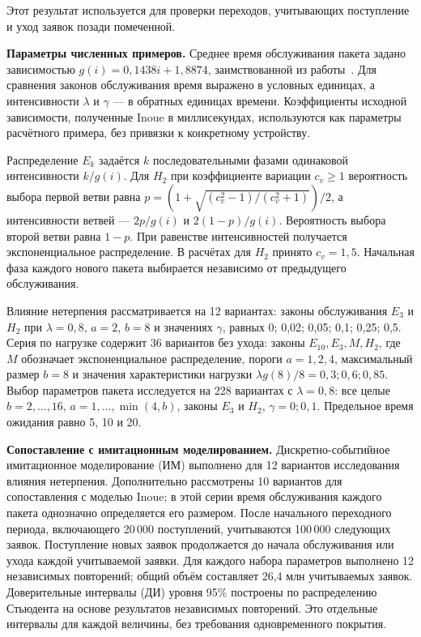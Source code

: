 Этот результат используется для проверки переходов, учитывающих поступление и уход заявок позади помеченной.

\noindent\textbf{Параметры численных примеров.}
Среднее время обслуживания пакета задано зависимостью $g(i)=0{,}1438i+1{,}8874$, заимствованной из работы~\cite{inoue2021}. Для сравнения законов обслуживания время выражено в условных единицах, а интенсивности $\lambda$ и $\gamma$ --- в обратных единицах времени. Коэффициенты исходной зависимости, полученные Inoue в миллисекундах, используются как параметры расчётного примера, без привязки к конкретному устройству.

Распределение $E_k$ задаётся $k$ последовательными фазами одинаковой интенсивности $k/g(i)$. Для $H_2$ при коэффициенте вариации $c_v\geq1$ вероятность выбора первой ветви равна $p=(1+\sqrt{(c_v^2-1)/(c_v^2+1)})/2$, а интенсивности ветвей --- $2p/g(i)$ и $2(1-p)/g(i)$. Вероятность выбора второй ветви равна $1-p$. При равенстве интенсивностей получается экспоненциальное распределение. В расчётах для $H_2$ принято $c_v=1{,}5$. Начальная фаза каждого нового пакета выбирается независимо от предыдущего обслуживания.

Влияние нетерпения рассматривается на 12 вариантах: законы обслуживания $E_3$ и $H_2$ при $\lambda=0{,}8$, $a=2$, $b=8$ и значениях $\gamma$, равных 0; 0,02; 0,05; 0,1; 0,25; 0,5. Серия по нагрузке содержит 36 вариантов без ухода: законы $E_{10},E_3,M,H_2$, где $M$ обозначает экспоненциальное распределение, пороги $a=1,2,4$, максимальный размер $b=8$ и значения характеристики нагрузки $\lambda g(8)/8=0{,}3;0{,}6;0{,}85$. Выбор параметров пакета исследуется на 228 вариантах с $\lambda=0{,}8$: все целые $b=2,\ldots,16$, $a=1,\ldots,\min(4,b)$, законы $E_3$ и $H_2$, $\gamma=0;0{,}1$. Предельное время ожидания равно 5, 10 и 20.

\noindent\textbf{Сопоставление с имитационным моделированием.}
Дискретно-событийное имитационное моделирование (ИМ) выполнено для 12 вариантов исследования влияния нетерпения. Дополнительно рассмотрены 10 вариантов для сопоставления с моделью Inoue; в этой серии время обслуживания каждого пакета однозначно определяется его размером. После начального переходного периода, включающего 20\,000 поступлений, учитываются 100\,000 следующих заявок. Поступление новых заявок продолжается до начала обслуживания или ухода каждой учитываемой заявки. Для каждого набора параметров выполнено 12 независимых повторений; общий объём составляет 26,4 млн учитываемых заявок. Доверительные интервалы (ДИ) уровня 95\% построены по распределению Стьюдента на основе результатов независимых повторений. Это отдельные интервалы для каждой величины, без требования одновременного покрытия.

